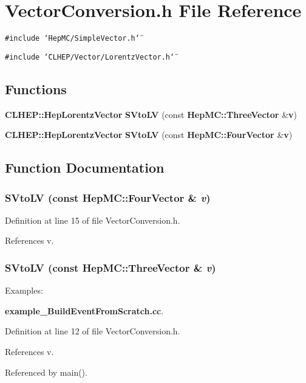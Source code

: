 \section{Vector\-Conversion.h File Reference}
\label{VectorConversion_8h}
{\tt \#include \char`\"{}Hep\-MC/Simple\-Vector.h\char`\"{}}\par
{\tt \#include \char`\"{}CLHEP/Vector/Lorentz\-Vector.h\char`\"{}}\par
\subsection*{Functions}
\begin{CompactItemize}
\item 
{\bf CLHEP::Hep\-Lorentz\-Vector} {\bf SVto\-LV} (const {\bf Hep\-MC::Three\-Vector} \&{\bf v})
\item 
{\bf CLHEP::Hep\-Lorentz\-Vector} {\bf SVto\-LV} (const {\bf Hep\-MC::Four\-Vector} \&{\bf v})
\end{CompactItemize}


\subsection{Function Documentation}
\subsubsection{ SVto\-LV (const {\bf Hep\-MC::Four\-Vector} \& {\em v})}\label{VectorConversion_8h_4537885bb707fb3397ebee8a38fac5a5}




Definition at line 15 of file Vector\-Conversion.h.

References v.
\subsubsection{ SVto\-LV (const {\bf Hep\-MC::Three\-Vector} \& {\em v})}\label{VectorConversion_8h_6a3ecd372c9b63e269d4adfd8db4c5cb}


\begin{Desc}
\item[Examples: ]\par
{\bf example\_\-Build\-Event\-From\-Scratch.cc}.\end{Desc}


Definition at line 12 of file Vector\-Conversion.h.

References v.

Referenced by main().